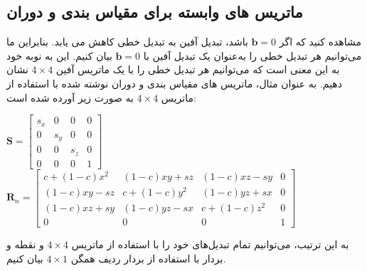 \subsection{\textbf{ماتریس های وابسته برای مقیاس بندی و دوران}}
\label{subsec:3.2.4}
{
    \Large
    \begin{spacing}{1.5}
        مشاهده کنید که اگر $\textbf{b}=0$ باشد، تبدیل آفین به تبدیل خطی کاهش می یابد.
        بنابراین ما می‌توانیم هر تبدیل خطی را به‌عنوان یک تبدیل آفین با $\textbf{b}=0$ بیان کنیم.
        این به نوبه خود به این معنی است که می‌توانیم هر تبدیل خطی را با یک ماتریس آفین $4\times 4$ نشان دهیم.
        به عنوان مثال، ماتریس های مقیاس بندی و دوران نوشته شده با استفاده از ماتریس $4\times 4$ به صورت زیر آورده شده است:

        \begin{center}
            $\textbf{S}=\begin{bmatrix}
                            s_x & 0   & 0   & 0 \\
                            0   & s_y & 0   & 0 \\
                            0   & 0   & s_z & 0 \\
                            0   & 0   & 0   & 1
            \end{bmatrix}$ \\
            $\textbf{R}_{n}=\begin{bmatrix}
                                c+(1-c)x^{2} & (1-c)xy+sz   & (1-c)xz-sy   & 0 \\
                                (1-c)xy-sz   & c+(1-c)y^{2} & (1-c)yz+sx   & 0 \\
                                (1-c)xz+sy   & (1-c)yz-sx   & c+(1-c)z^{2} & 0 \\
                                0            & 0            & 0            & 1
            \end{bmatrix}$
        \end{center}

        به این ترتیب، می‌توانیم تمام تبدیل‌های خود را با استفاده از ماتریس $4\times 4$ و نقطه و بردار با استفاده از بردار ردیف همگن $4\times 1$ بیان کنیم.
    \end{spacing}
}

